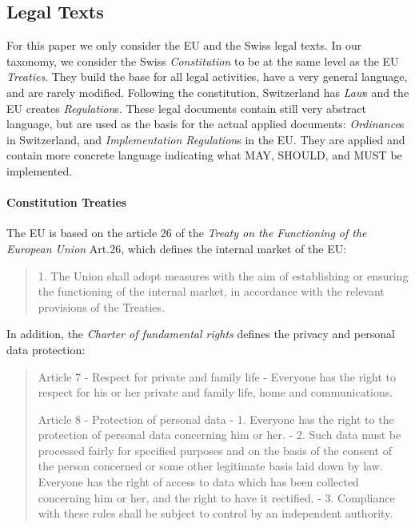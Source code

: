 \subsection{Legal Texts} 

For this paper we only consider the EU and the Swiss legal texts.
In our taxonomy, we consider the Swiss \emph{Constitution} to be
at the same level as the EU \emph{Treaties}.
They build the base for all legal activities, have a very general
language, and are rarely modified.
Following the constitution, Switzerland has \emph{Law}s and the EU
creates \emph{Regulation}s.
These legal documents contain still very abstract language, but
are used as the basis for the actual applied documents:
\emph{Ordinance}s in Switzerland, and 
\emph{Implementation Regulation}s in the EU.
They are applied and contain more concrete language
indicating what MAY, SHOULD, and MUST be implemented.

\vspace{1cm}


\paragraph{Constitution Treaties}

The EU \eid is based on the article 26 of the \emph{Treaty on the Functioning of the European Union}
\cite{EUTreaties}{Art.26}, which defines the internal market of the EU:
\begin{quote}
    1.   The Union shall adopt measures with the aim of establishing or ensuring the functioning of the internal market, in accordance with the relevant provisions of the Treaties.
\end{quote}
In addition, the \emph{Charter of fundamental rights} defines the privacy and personal data protection:
\begin{quote}
    Article 7 - Respect for private and family life - Everyone has the right to respect for his or her private and family life, home and communications.
    
    Article 8 - Protection of personal data - 1.   Everyone has the right to the protection of personal data concerning him or her.
    - 2.   Such data must be processed fairly for specified purposes and on the basis of the consent of the person concerned or some other legitimate basis laid down by law. Everyone has the right of access to data which has been collected concerning him or her, and the right to have it rectified. - 3.   Compliance with these rules shall be subject to control by an independent authority.
\end{quote}

